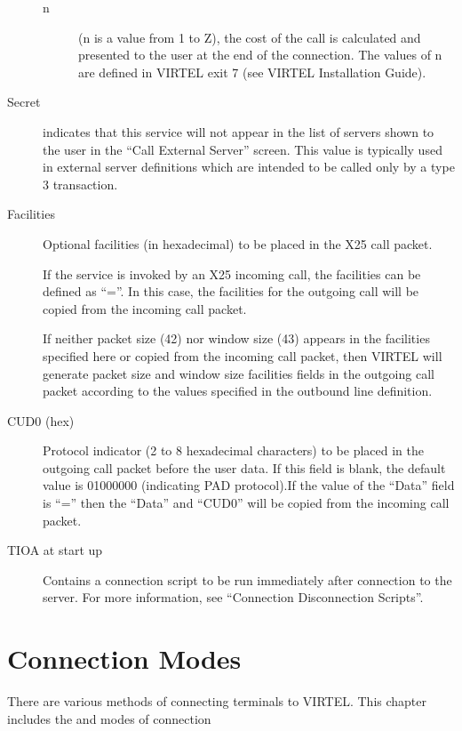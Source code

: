 \documentclass[letterpaper,10pt,english]{sphinxmanual}
\begin{document}
\begin{description}
\begin{description}
\item[{n}] \leavevmode
(n is a value from 1 to Z), the cost of the call is calculated and presented to the user at the end of the connection. The values of n are defined in VIRTEL exit 7 (see VIRTEL Installation Guide).

\end{description}

\item[{Secret}]  indicates that this service will not appear in the list of servers shown to the user in the “Call External Server” screen. This value is typically used in external server definitions which are intended to be called only by a type 3 transaction.

\item[{Facilities}] \leavevmode
Optional facilities (in hexadecimal) to be placed in the X25 call packet.

If the service is invoked by an X25 incoming call, the facilities can be defined as “=”. In this case, the facilities for the outgoing call will be copied from the incoming call packet.

If neither packet size (42) nor window size (43) appears in the facilities specified here or copied from the incoming call packet, then VIRTEL will generate packet size and window size facilities fields in the outgoing call packet according to the values specified in the outbound line definition.

\item[{CUD0 (hex)}] \leavevmode
Protocol indicator (2 to 8 hexadecimal characters) to be placed in the outgoing call packet before the user data. If this field is blank, the default value is 01000000 (indicating PAD protocol).If the value of the “Data” field is “=” then the “Data” and “CUD0” will be copied from the incoming call packet.

\item[{TIOA at start up}] \leavevmode
Contains a connection script to be run immediately after connection to the server. For more information, see “Connection \textendash{} Disconnection Scripts”.

\end{description}


\chapter{Connection Modes}
\label{\detokenize{connectivity_guide:connection-modes}}\label{\detokenize{connectivity_guide:index-135}}
There are various methods of connecting terminals to VIRTEL. This chapter includes the  and  modes of connection
\end{document}
